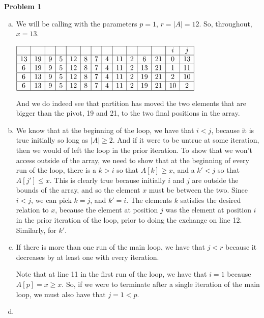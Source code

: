 \documentclass{article}
\begin{document}
\noindent\textbf{Problem 1}\\
\begin{enumerate}[a.]
\item
We will be calling with the parameters $p=1$, $r=|A|=12$. So, throughout, $x=13$.
 
$
\begin{array}{|c|c|c|c|c|c|c|c|c|c|c|c|c|c|c|}
\hline
&&&&&&&&&&&&i&j\\
\hline
13&19&9&5&12&8&7&4&11&2&6&21&0&13\\
\hline
6&19&9&5&12&8&7&4&11&2&13&21&1&11\\
\hline
6&13&9&5&12&8&7&4&11&2&19&21&2&10\\
\hline
6&13&9&5&12&8&7&4&11&2&19&21&10&2\\
\hline
\end{array}
$

And we do indeed see that partition has moved the two elements that are bigger than the pivot, 19 and 21, to the two final positions in the array.

\item
We know that at the beginning of the loop, we have that $i<j$, because it is true initially so long as $|A|\ge 2$. And if it were to be untrue at some iteration, then we would of left the loop in the prior iteration. To show that we won't access outside of the array, we need to show that at the beginning of every run of the loop, there is a $k>i$ so that $A[k]\ge x$, and a $k'<j$ so that $A[j']\le x$. This is clearly true because initially $i$ and $j$ are outside the bounds of the array, and so the element $x$ must be between the two. Since $i<j$, we can pick $k=j$, and $k' =i$. The elements $k$ satisfies the desired relation to $x$, because the element at position $j$ was the element at position $i$ in the prior iteration of the loop, prior to doing the exchange on line 12. Similarly, for $k'$.

\item

If there is more than one run of the main loop, we have that $j<r$ because it decreases by at least one with every iteration.

Note that at line 11 in the first run of the loop, we have that $i=1$ because $A[p] =x \ge x$. So, if we were to terminate after a single iteration of the main loop, we must also have that $j=1 <p$.

\item


\end{enumerate}
\end{document}
